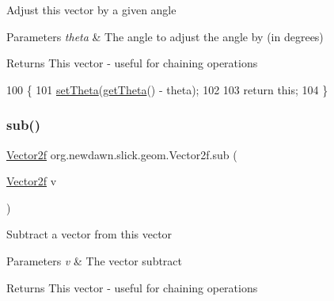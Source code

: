 Adjust this vector by a given angle


\begin{DoxyParams}{Parameters}
{\em theta} & The angle to adjust the angle by (in degrees) \\
\hline
\end{DoxyParams}
\begin{DoxyReturn}{Returns}
This vector -\/ useful for chaining operations 
\end{DoxyReturn}

\begin{DoxyCode}
100                                       \{
101         \mbox{\hyperlink{classorg_1_1newdawn_1_1slick_1_1geom_1_1_vector2f_aa6922f08881bf7465883171ab2f8a61a}{setTheta}}(\mbox{\hyperlink{classorg_1_1newdawn_1_1slick_1_1geom_1_1_vector2f_a84195f4ba1d982a324cf8ce49f981d6d}{getTheta}}() - theta);
102         
103         \textcolor{keywordflow}{return} \textcolor{keyword}{this};
104     \}
\end{DoxyCode}
\mbox{\label{classorg_1_1newdawn_1_1slick_1_1geom_1_1_vector2f_aff19490b443e0a829ab016be6bc2295a}} 
\subsubsection{\texorpdfstring{sub()}{sub()}\hspace{0.1cm}{\footnotesize\ttfamily [2/2]}}
{\footnotesize\ttfamily \mbox{\hyperlink{classorg_1_1newdawn_1_1slick_1_1geom_1_1_vector2f}{Vector2f}} org.\+newdawn.\+slick.\+geom.\+Vector2f.\+sub (\begin{DoxyParamCaption}\item[{\mbox{\hyperlink{classorg_1_1newdawn_1_1slick_1_1geom_1_1_vector2f}{Vector2f}}}]{v }\end{DoxyParamCaption})\hspace{0.3cm}{\ttfamily [inline]}}

Subtract a vector from this vector


\begin{DoxyParams}{Parameters}
{\em v} & The vector subtract \\
\hline
\end{DoxyParams}
\begin{DoxyReturn}{Returns}
This vector -\/ useful for chaining operations 
\end{DoxyReturn}

